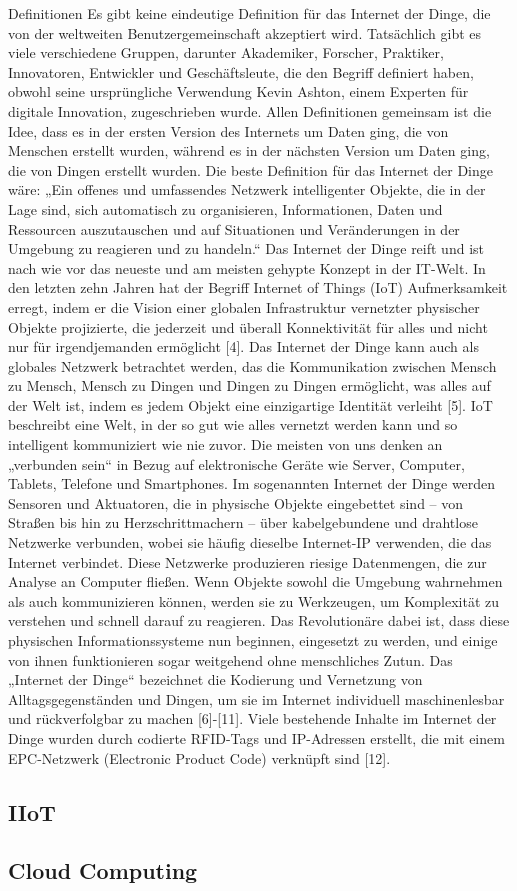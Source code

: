     Definitionen
    Es gibt keine eindeutige Definition für das Internet der Dinge, die von der weltweiten Benutzergemeinschaft 
    akzeptiert wird. Tatsächlich gibt es viele verschiedene Gruppen, darunter Akademiker, Forscher, Praktiker, 
    Innovatoren, Entwickler und Geschäftsleute, die den Begriff definiert haben, obwohl seine ursprüngliche 
    Verwendung Kevin Ashton, einem Experten für digitale Innovation, zugeschrieben wurde. Allen Definitionen 
    gemeinsam ist die Idee, dass es in der ersten Version des Internets um Daten ging, die von Menschen erstellt 
    wurden, während es in der nächsten Version um Daten ging, die von Dingen erstellt wurden. Die beste Definition 
    für das Internet der Dinge wäre:
    „Ein offenes und umfassendes Netzwerk intelligenter Objekte, die in der Lage sind, sich automatisch zu organisieren, 
    Informationen, Daten und Ressourcen auszutauschen und auf Situationen und Veränderungen in der Umgebung zu reagieren 
    und zu handeln.“
    Das Internet der Dinge reift und ist nach wie vor das neueste und am meisten gehypte Konzept in der IT-Welt. 
    In den letzten zehn Jahren hat der Begriff Internet of Things (IoT) Aufmerksamkeit erregt, indem er die Vision 
    einer globalen Infrastruktur vernetzter physischer Objekte projizierte, die jederzeit und überall Konnektivität für 
    alles und nicht nur für irgendjemanden ermöglicht [4]. Das Internet der Dinge kann auch als globales Netzwerk 
    betrachtet werden, das die Kommunikation zwischen Mensch zu Mensch, Mensch zu Dingen und Dingen zu Dingen 
    ermöglicht, was alles auf der Welt ist, indem es jedem Objekt eine einzigartige Identität verleiht [5]. 
    IoT beschreibt eine Welt, in der so gut wie alles vernetzt werden kann und so intelligent kommuniziert wie nie zuvor. 
    Die meisten von uns denken an „verbunden sein“ in Bezug auf elektronische Geräte wie Server, Computer, Tablets, Telefone 
    und Smartphones. Im sogenannten Internet der Dinge werden Sensoren und Aktuatoren, die in physische Objekte eingebettet 
    sind – von Straßen bis hin zu Herzschrittmachern – über kabelgebundene und drahtlose Netzwerke verbunden, wobei sie 
    häufig dieselbe Internet-IP verwenden, die das Internet verbindet. Diese Netzwerke produzieren riesige Datenmengen, 
    die zur Analyse an Computer fließen. Wenn Objekte sowohl die Umgebung wahrnehmen als auch kommunizieren können, 
    werden sie zu Werkzeugen, um Komplexität zu verstehen und schnell darauf zu reagieren. Das Revolutionäre dabei ist, 
    dass diese physischen Informationssysteme nun beginnen, eingesetzt zu werden, und einige von ihnen funktionieren sogar 
    weitgehend ohne menschliches Zutun. Das „Internet der Dinge“ bezeichnet die Kodierung und Vernetzung von 
    Alltagsgegenständen und Dingen, um sie im Internet individuell maschinenlesbar und rückverfolgbar zu machen [6]-[11]. 
    Viele bestehende Inhalte im Internet der Dinge wurden durch codierte RFID-Tags und IP-Adressen erstellt, die mit einem 
    EPC-Netzwerk (Electronic Product Code) verknüpft sind [12].




\subsection{IIoT}
\subsection{Cloud Computing}